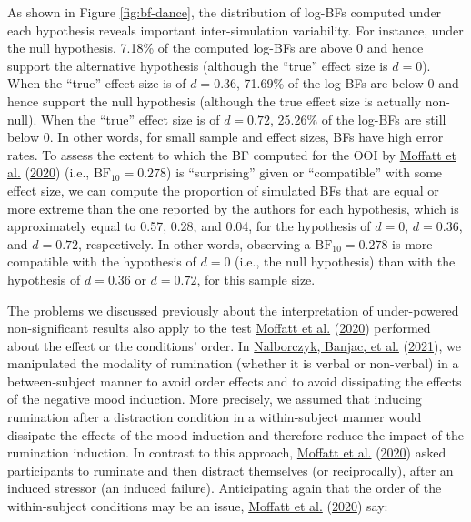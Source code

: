 \documentclass[
  english,
  man, donotrepeattitle,mask,floatsintext]{apa6}
\begin{document}
As shown in Figure \ref{fig:bf-dance}, the distribution of log-BFs computed under each hypothesis reveals important inter-simulation variability. For instance, under the null hypothesis, 7.18\% of the computed log-BFs are above 0 and hence support the alternative hypothesis (although the ``true'' effect size is \(d = 0\)). When the ``true'' effect size is of \(d = 0.36\), 71.69\% of the log-BFs are below 0 and hence support the null hypothesis (although the true effect size is actually non-null). When the ``true'' effect size is of \(d = 0.72\), 25.26\% of the log-BFs are still below 0. In other words, for small sample and effect sizes, BFs have high error rates. To assess the extent to which the BF computed for the OOI by \protect\hyperlink{ref-moffatt_inner_2020}{Moffatt et al.} (\protect\hyperlink{ref-moffatt_inner_2020}{2020}) (i.e., \(\text{BF}_{10} = 0.278\)) is ``surprising'' given or ``compatible'' with some effect size, we can compute the proportion of simulated BFs that are equal or more extreme than the one reported by the authors for each hypothesis, which is approximately equal to 0.57, 0.28, and 0.04, for the hypothesis of \(d = 0\), \(d = 0.36\), and \(d = 0.72\), respectively. In other words, observing a \(\text{BF}_{10} = 0.278\) is more compatible with the hypothesis of \(d = 0\) (i.e., the null hypothesis) than with the hypothesis of \(d = 0.36\) or \(d = 0.72\), for this sample size.

The problems we discussed previously about the interpretation of under-powered non-significant results also apply to the test \protect\hyperlink{ref-moffatt_inner_2020}{Moffatt et al.} (\protect\hyperlink{ref-moffatt_inner_2020}{2020}) performed about the effect or the conditions' order. In \protect\hyperlink{ref-nalborczyk_dissociating_2021}{Nalborczyk, Banjac, et al.} (\protect\hyperlink{ref-nalborczyk_dissociating_2021}{2021}), we manipulated the modality of rumination (whether it is verbal or non-verbal) in a between-subject manner to avoid order effects and to avoid dissipating the effects of the negative mood induction. More precisely, we assumed that inducing rumination after a distraction condition in a within-subject manner would dissipate the effects of the mood induction and therefore reduce the impact of the rumination induction. In contrast to this approach, \protect\hyperlink{ref-moffatt_inner_2020}{Moffatt et al.} (\protect\hyperlink{ref-moffatt_inner_2020}{2020}) asked participants to ruminate and then distract themselves (or reciprocally), after an induced stressor (an induced failure). Anticipating again that the order of the within-subject conditions may be an issue, \protect\hyperlink{ref-moffatt_inner_2020}{Moffatt et al.} (\protect\hyperlink{ref-moffatt_inner_2020}{2020}) say:
\end{document}
